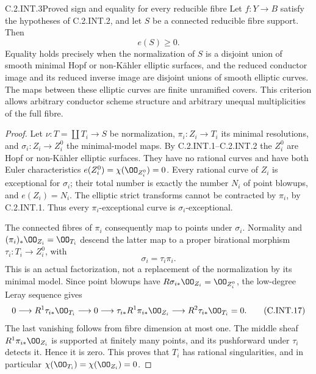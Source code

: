 \begin{idstatement}{C.2.INT.3}{Proved sign and equality for every reducible fibre}
\label{st:C.2.INT.3}
Let $f:Y\to B$ satisfy the hypotheses of C.2.INT.2,
and let $S$ be a connected reducible fibre support.
Then
\[
 e(S)\ge0.
 \tag{C.INT.15}
\]
Equality holds precisely when the normalization of $S$
is a disjoint union of smooth minimal Hopf or
non-K\"ahler elliptic surfaces, and the reduced
conductor image and its reduced inverse image are
disjoint unions of smooth elliptic curves. The maps
between these elliptic curves are finite unramified
covers. This criterion allows arbitrary conductor
scheme structure and arbitrary unequal multiplicities
of the full fibre.
\end{idstatement}
\begin{proof}
Let $\nu:T=\coprod T_i\to S$ be normalization,
$\pi_i:Z_i\to T_i$ its minimal resolutions, and
$\sigma_i:Z_i\to Z_i^0$ the minimal-model maps.
By C.2.INT.1--C.2.INT.2 the $Z_i^0$ are Hopf or
non-K\"ahler elliptic surfaces. They have no rational
curves and have both Euler characteristics
$e(Z_i^0)=\chi(\OO_{Z_i^0})=0$.
Every rational curve of $Z_i$ is exceptional for
$\sigma_i$; their total number is exactly the number
$N_i$ of point blowups, and $e(Z_i)=N_i$.
The elliptic strict transforms cannot be contracted
by $\pi_i$, by C.2.INT.1. Thus every
$\pi_i$-exceptional curve is $\sigma_i$-exceptional.

The connected fibres of $\pi_i$ consequently map to
points under $\sigma_i$. Normality and
$(\pi_i)_*\OO_{Z_i}=\OO_{T_i}$ descend the latter
map to a proper birational morphism
$\tau_i:T_i\to Z_i^0$, with
\[
 \sigma_i=\tau_i\pi_i.
 \tag{C.INT.16}
\]
This is an actual factorization, not a replacement
of the normalization by its minimal model.
Since point blowups have $R\sigma_{i*}\OO_{Z_i}
=\OO_{Z_i^0}$, the low-degree Leray sequence gives
\[
 0\longrightarrow R^1\tau_{i*}\OO_{T_i}
 \longrightarrow 0
 \longrightarrow \tau_{i*}R^1\pi_{i*}\OO_{Z_i}
 \longrightarrow R^2\tau_{i*}\OO_{T_i}=0.
 \tag{C.INT.17}
\]
The last vanishing follows from fibre dimension at
most one. The middle sheaf $R^1\pi_{i*}\OO_{Z_i}$
is supported at finitely many points, and its
pushforward under $\tau_i$ detects it. Hence it is
zero. This proves that $T_i$ has rational
singularities, and in particular
$\chi(\OO_{T_i})=\chi(\OO_{Z_i})=0$.


\end{proof}
